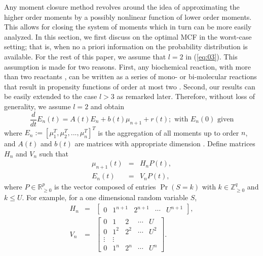 \documentclass[letterpaper, 10 pt, conference]{ieeeconf}
\begin{document}
Any moment closure method revolves around the idea of approximating the
higher order moments by a possibly nonlinear function of lower order
moments. This allows for closing the system of moments which in turn can be
more easily analyzed. In this section, we first discuss on the optimal MCF
in the worst-case setting; that is, when no a priori information on the
probability distribution is available. For the rest of this paper, we assume
that $l=2$ in (\ref{eq:03}). This assumption is made for two reasons. First,
any biochemical reaction, with more than two reactants , can be written as a
series of mono- or bi-molecular reactions that result in propensity
functions of order at most two \cite{gillespie2014validity}. Second, our
results can be easily extended to the case $l>3$ as remarked later.
Therefore, without loss of generality, we assume $l=2$ and obtain%
\begin{equation}
\frac{d}{dt}E_{n}\left( t\right) =A\left( t\right) E_{n}+b\left( t\right)
\mu _{n+1}+r\left( t\right) ;\text{ with }E_{n}\left( 0\right) \text{ given}
\label{eq:03'}
\end{equation}%
where $E_{n}:=\left[ \mu _{1}^{T},\mu _{2}^{T},...,\mu _{n}^{T}\right] ^{T}$
is the aggregation of all moments up to order $n$, and $A\left( t\right) $
and $b\left( t\right) $ are matrices with appropriate dimension \cite%
{sotiropoulos2011analytical}. Define matrices $H_{n}$ and $V_{n}$ such that 
\begin{eqnarray}
\mu _{n+1}\left( t\right) &=&H_{n}P\left( t\right) ,  \label{eq:H} \\
E_{n}\left( t\right) &=&V_{n}P\left( t\right) ,  \label{eq:V}
\end{eqnarray}%
where $P\in \mathbb{R}_{\geq 0}^{p}$ is the vector composed of entries $\Pr
\left( S=k\right) $ with $k\in \mathbb{Z}_{\geq 0}^{q}$ and $k\leq U$. For
example, for a one dimensional random variable $S$, 
\begin{eqnarray*}
H_{n} &=&\left[ 
\begin{array}{ccccc}
0 & 1^{n+1} & 2^{n+1} & \cdots & U^{n+1}%
\end{array}%
\right] , \\
V_{n} &=&\left[ 
\begin{array}{ccccc}
0 & 1 & 2 & \cdots & U \\ 
0 & 1^{2} & 2^{2} & \cdots & U^{2} \\ 
\vdots & \vdots &  &  &  \\ 
0 & 1^{n} & 2^{n} & \cdots & U^{n}%
\end{array}%
\right] .
\end{eqnarray*}
\end{document}
